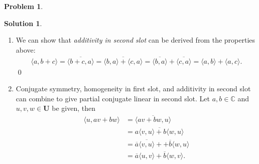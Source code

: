 \documentclass{article}
\theoremstyle{definition}
\newtheorem*{prob*}{Problem}
\newtheorem*{sln*}{Solution}
\newcommand{\R}{\mathbb{R}}
\newcommand{\U}{\mathbf{U}}
\newcommand{\la}{\langle}
\newcommand{\ra}{\rangle}
\begin{document}
\begin{prob*}
\begin{enumerate}
\begin{sln*}
\begin{enumerate}
\begin{enumerate}
					\item The last step is to show that $\la \lambda u,v\ra = \lambda \la u,v \ra$ still holds when $\lambda$ is any real number. Once this is shown, showing $\la \lambda u,v \ra = \lambda\la u,v \ra$ will be much simpler.\\
					\textbf{But this is where I'm stuck. I'm hoping to somehow express $\lambda$, a real number, in terms of rational numbers, but I don't know how.}
					
					\item Assume that we have successfully completed the previous part, then let $\lambda = a + ib$ where $a,b\in \R$, then
					\begin{align*}
					\la \lambda u ,v\ra &= \la (a+ib)u,v \ra\\ &= \la au,v\ra + \la ibu,v \ra\\ &= a\la u,v \ra + b\la iu,v\ra\\ &= a\la u,v \ra + ib\la u,v \ra \\&= (a+ib)\la u,v \ra\\&= \lambda\la u,v \ra.
					\end{align*}
					\qed
				\end{enumerate}
				
				
				
				
				\item We can show that \textit{additivity in second slot} can be derived from the properties above:
				\begin{align*}
				\la a,b+c \ra = \overline{\la b+c,a  \ra} = \overline{\la b,a \ra + \la c,a \ra} = \overline{\la b,a \ra} + \overline{\la c,a\ra} =\la a,b\ra + \la a,c \ra.
				\end{align*}\qed
				
				\item Conjugate symmetry, homogeneity in first slot, and additivity in second slot can combine to give partial conjugate linear in second slot. Let $a , b \in \mathbb{C}$ and $u,v,w\in \U$ be given, then
				\begin{align*}
				\la u, av + bw \ra &= \overline{\la av+bw, u \ra}\\
				&= \overline{a\la v,u \ra + b\la w,u \ra}\\
				&= \overline{a}\overline{\la v,u \ra} + + \overline{b}\la w,u \ra\\
				&= \overline{a}\la u,v \ra + \overline{b}\la w,v \ra.
				\end{align*}
				
				
			\end{enumerate}
			

\end{sln*}
\end{enumerate}
\end{prob*}
\end{document}
